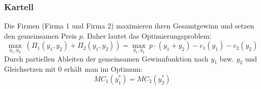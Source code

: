 \subsubsection*{Kartell}

Die Firmen (Firma 1 und Firma 2) maximieren ihren Gesamtgewinn und setzen den gemeinsamen Preis $p$. Daher lautet das Optimierungsproblem: 
	$$ \max_{y_1, y_2} ~ \left( \Pi_1(y_1, y_2) + \Pi_2(y_1, y_2) \right) = \max_{y_1, y_2} ~ p \cdot \left( y_1 + y_2 \right) - c_1(y_1) - c_2(y_2) $$
Durch partiellen Ableiten der gemeinsamen Gewinnfunktion nach $y_1$ bzw. $y_2$ und Gleichsetzen mit $0$ erhält man im Optimum:
	$$ MC_1(y_1^*) = MC_2(y_2^*) $$	
